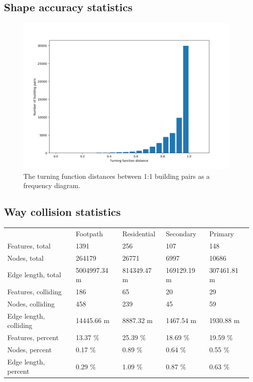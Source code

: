 \documentclass[a4paper]{article}
\begin{document}
\subsection{Shape accuracy statistics}


\begin{figure}[H]
    \centering
    \includegraphics[width=\textwidth,height=0.5\textheight,keepaspectratio]{img_turning_function_plot}
    \caption{The turning function distances between 1:1 building pairs as a frequency diagram.}
    \label{fig:space}
\end{figure}


\subsection{Way collision statistics}

\begin{table}[H]
\begin{tabular}{lllll}
                            & Footpath      & Residential  & Secondary   & Primary     \\
    Features, total         & 1391          & 256          & 107         & 148         \\
    Nodes, total            & 264179        & 26771        & 6997        & 10686       \\
    Edge length, total      & 5004997.34 m  & 814349.47 m  & 169129.19 m & 307461.81 m \\
    Features, colliding     & 186           & 65           & 20          & 29          \\
    Nodes, colliding        & 458           & 239          & 45          & 59          \\
    Edge length, colliding  & 14445.66 m    & 8887.32 m    & 1467.54 m   & 1930.88 m   \\
    Features, percent       & 13.37 \%      & 25.39 \%     & 18.69 \%    & 19.59 \%    \\
    Nodes, percent          & 0.17 \%       & 0.89 \%      & 0.64 \%     & 0.55 \%     \\
    Edge length, percent    & 0.29 \%       & 1.09 \%      & 0.87 \%     & 0.63 \%

\end{tabular}
\end{table}
\end{document}
